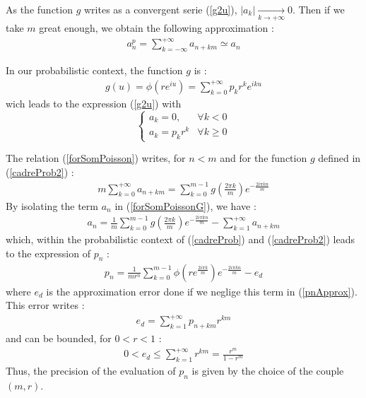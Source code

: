 As the function $g$ writes as a convergent serie (\ref{g2u}), $|a_k| \underset{k \rightarrow +\infty}{\rightarrow} 0$. Then if we take $m$ great enough, we obtain the following approximation : 
\begin{eqnarray}\label{anpApprox}
a_n^p  =  \sum_{k=-\infty}^{+\infty} a_{n+km} \simeq a_n
\end{eqnarray}

In our probabilistic context, the function $g$ is : 
\begin{eqnarray}\label{cadreProb}
g(u) = \phi\left(re^{iu}\right) = \sum_{k=0}^{+\infty}p_k r^k e^{iku}
\end{eqnarray}
wich leads to the expression (\ref{g2u}) with
\begin{equation}\label{cadreProb2}
\left\{
\begin{array}{ll}
  a_k = 0, & \forall k<0 \\
  a_k = p_kr^k & \forall k \geq 0
\end{array}
\right.
\end{equation}

The relation (\ref{forSomPoisson}) writes, for $n < m$ and for the function $g$ defined in (\ref{cadreProb2})  :
\begin{eqnarray}\label{forSomPoissonG}
m \sum_{k=0}^{+\infty}a_{n+km} = \sum_{k=0}^{m-1} g\left(\frac{2\pi k}{m}\right)e^{-\frac{2i\pi kn}{m}}
\end{eqnarray}
By isolating the term $a_n$ in (\ref{forSomPoissonG}), we have : 
\begin{eqnarray}\label{termeAn}
a_n = \displaystyle \frac{1}{m} \sum_{k=0}^{m-1} g\left(\frac{2\pi k}{m}\right)e^{-\frac{2i\pi kn}{m}} - \sum_{k=1}^{+\infty}a_{n+km}
\end{eqnarray}
which, within the probabilistic context of (\ref{cadreProb}) and (\ref{cadreProb2}) leads to the expression of $p_n$ : 
\begin{eqnarray}\label{pnApprox}
p_n = \displaystyle \frac{1}{mr^n} \sum_{k=0}^{m-1} \phi\left(re^{\frac{2i\pi k}{m}}\right) e^{-\frac{2i\pi kn}{m}} - e_d
\end{eqnarray}
where $e_d$ is the approximation error done if we neglige this term in (\ref{pnApprox}). This error writes : 
\begin{eqnarray}\label{ed}
e_d = \displaystyle \sum_{k=1}^{+\infty}p_{n+km}r^{km}
\end{eqnarray}
and can be bounded, for $0 < r < 1$ : 
\begin{eqnarray}\label{edEncadr}
0 < e_d \leq  \sum_{k=1}^{+\infty}r^{km} = \displaystyle \frac{r^m}{1-r^m}
\end{eqnarray}
Thus, the precision of the evaluation of $p_n$ is given by the choice of the couple $(m,r)$.\\

